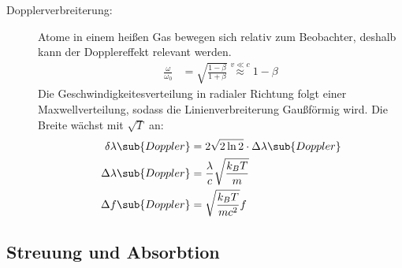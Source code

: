 \documentclass[twocolumn]{summery_4.1}
\begin{document}
\begin{description}
    \item[Dopplerverbreiterung:]
    Atome in einem heißen Gas bewegen sich relativ zum Beobachter, deshalb kann der Dopplereffekt relevant werden.
    \begin{align*}
        \frac{\omega}{\omega_0} &= \sqrt{\frac{1-\beta}{1+\beta}}
        \overset{v\ll c}\approx 1-\beta 
    \end{align*}
    Die Geschwindigkeitesverteilung in radialer Richtung folgt einer Maxwellverteilung, sodass die Linienverbreiterung Gaußförmig wird.
    Die Breite wächst mit \(\sqrt T\) an:
    \begin{align*}
        \delta \lambda\sub{Doppler} 
    &= 2\sqrt{2\ln 2 }\cdot \Delta\lambda\sub{Doppler}\\
    \Delta \lambda\sub{Doppler}&= \frac{\lambda}{c} \sqrt{\frac{k_B T}{m}}\\
    \Delta f\sub{Doppler}&= \sqrt{\frac{k_B T}{mc^2}} f
    \end{align*}
\end{description}

\subsection{Streuung und Absorbtion}
\end{document}
